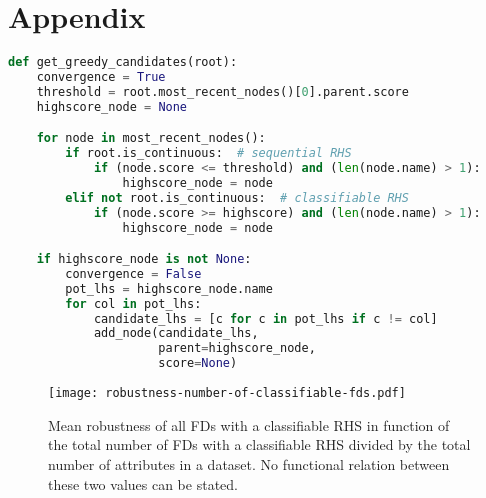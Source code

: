 \section{Appendix}

\begin{lstlisting}[caption={`Greedy' Candidate Generation in DepDetector},captionpos=b,language=Python,label=lst:greedy-depdetector]
def get_greedy_candidates(root):
    convergence = True
    threshold = root.most_recent_nodes()[0].parent.score
    highscore_node = None

    for node in most_recent_nodes():
        if root.is_continuous:  # sequential RHS
            if (node.score <= threshold) and (len(node.name) > 1):
                highscore_node = node
        elif not root.is_continuous:  # classifiable RHS
            if (node.score >= highscore) and (len(node.name) > 1):
                highscore_node = node

    if highscore_node is not None:
        convergence = False
        pot_lhs = highscore_node.name
        for col in pot_lhs:
            candidate_lhs = [c for c in pot_lhs if c != col]
            add_node(candidate_lhs,
                     parent=highscore_node,
                     score=None)
\end{lstlisting}

\begin{figure}[ht]
     \centering
     \texttt{[image: robustness-number-of-classifiable-fds.pdf]}
     \caption{Mean robustness of all FDs with a classifiable RHS in function of the total number of FDs with a classifiable RHS divided by the total number of attributes in a dataset. No functional relation between these two values can be stated.}
     \label{fig:robustness-number-of-classifiable-fds}
 \end{figure}
